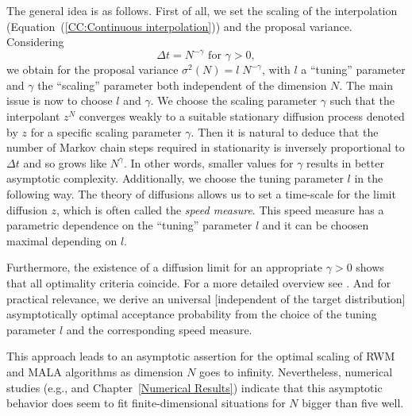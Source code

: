 The general idea is as follows. First of all, we set the scaling of the interpolation (Equation~(\ref{CC:Continuous interpolation})) and the proposal variance. Considering 
\begin{equation}
\label{CC:Choice of scaling gamma}
  \Delta t = N^{-\gamma} \text{ for } \gamma > 0,                                                                                                                                                                                                                                                                                                                       \end{equation}
we obtain for the proposal variance $ \sigma^2 (N) = l\;N^{-\gamma} $, with $l$ a ``tuning'' parameter and $ \gamma $ the ``scaling'' parameter both independent of the dimension $N$. The main issue is now to choose $l$ and $\gamma$. We choose the scaling parameter $\gamma$ such that the interpolant $ z^{N} $ converges weakly to a suitable stationary diffusion process denoted by $z$ for a specific scaling parameter $\gamma$. Then it is natural to deduce that the number of Markov chain steps required in stationarity is inversely proportional to $ \Delta t $ and so grows like $ N^{\gamma} $. In other words, smaller values for $\gamma$ results in better asymptotic complexity. Additionally, we choose the tuning parameter $l$ in the following way. The theory of diffusions allows us to set a time-scale for the limit diffusion $z$, which is often called the \textit{speed measure}. This speed measure has a parametric dependence on the ``tuning'' parameter $l$ and it can be choosen maximal depending on $l$. 

Furthermore, the existence of a diffusion limit for an appropriate $ \gamma > 0 $ shows that all optimality criteria coincide. For a more detailed overview see \autocite{Beskos2009}. And for practical relevance, we derive an universal [independent of the target distribution] asymptotically optimal acceptance probability from the choice of the tuning parameter $l$ and the corresponding speed measure.

\begin{rem}
\label{rem:finite dimension}
 This approach leads to an asymptotic assertion for the optimal scaling of RWM and MALA algorithms as dimension $N$ goes to infinity. Nevertheless, numerical studies (e.g., \autocite{Gelman1996, Roberts2001} and Chapter~\ref{Numerical Results}) indicate that this asymptotic behavior does seem to fit finite-dimensional situations for $N$ bigger than five well.
\end{rem}

